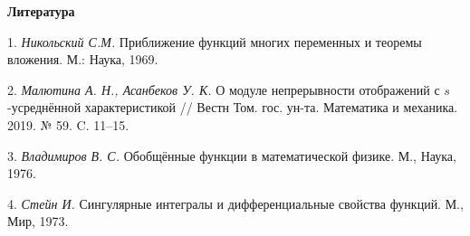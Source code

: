 \smallskip \centerline {\bf Литература} \nopagebreak

1. {\it Никольский С.М.} Приближение функций многих переменных и теоремы вложения. М.: Наука, 1969.

2. {\it Малютина А. Н., Асанбеков У. К.} О модуле непрерывности отображений с $s$-усреднённой характеристикой // Вестн Том. гос. ун-та. Математика и механика. 2019. № 59. C. 11–15.

3. {\it Владимиров В. С.} Обобщённые функции в математической физике. М., Наука, 1976.

4. {\it Стейн И.} Сингулярные интегралы и дифференциальные свойства функций. М., Мир, 1973.
